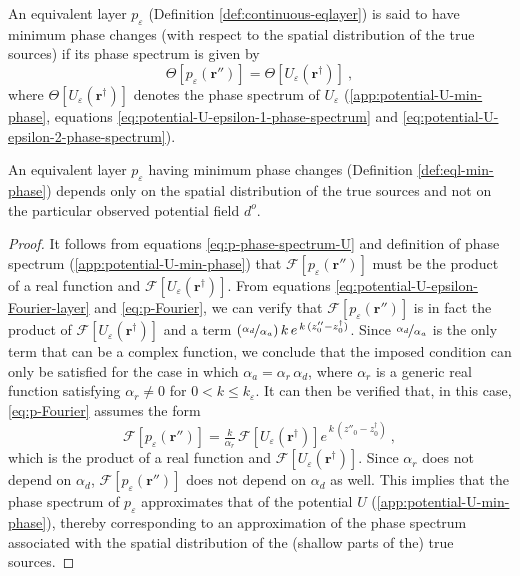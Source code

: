 \begin{definition}
	An equivalent layer $p_{\varepsilon}$ (Definition \ref{def:continuous-eqlayer}) is said to have minimum 
	phase changes (with respect to the spatial distribution of the true sources) if its phase spectrum is given by
	\begin{equation}
		\Theta [ p_{\varepsilon}(\mathbf{r}'') ] = \Theta [ U_{\varepsilon}(\mathbf{r}^{\dagger}) ] \: ,
		\label{eq:p-phase-spectrum-U}
	\end{equation}
	where $\Theta [ U_{\varepsilon}(\mathbf{r}^{\dagger}) ]$ denotes the phase spectrum of $U_{\varepsilon}$ 
	(\ref{app:potential-U-min-phase}, equations \ref{eq:potential-U-epsilon-1-phase-spectrum} and \ref{eq:potential-U-epsilon-2-phase-spectrum}).
	\label{def:eql-min-phase}
\end{definition}
\begin{proposition}
	\label{prop:minimum-phase-change-layers}
	An equivalent layer $p_{\varepsilon}$ having minimum phase changes (Definition \ref{def:eql-min-phase})
	depends only on the spatial distribution of the true sources and not on the particular observed 
	potential field $d^{o}$.
\end{proposition}
\begin{proof}
	It follows from equations \ref{eq:p-phase-spectrum-U} and definition of phase spectrum (\ref{app:potential-U-min-phase}) that 
	$\mathcal{F} [ p_{\varepsilon}(\mathbf{r}'') ]$ must be the product of a real function and
	$\mathcal{F} [ U_{\varepsilon}(\mathbf{r}^{\dagger}) ]$.
	From equations \ref{eq:potential-U-epsilon-Fourier-layer} and \ref{eq:p-Fourier}, we can verify that 
	$\mathcal{F} [ p_{\varepsilon}(\mathbf{r}'') ]$ is in fact the product of 
	$\mathcal{F} [ U_{\varepsilon}(\mathbf{r}^{\dagger}) ]$ 
	and a term $\left( \nicefrac{\alpha_{d}}{\alpha_{a}} \right) k \, e^{\, k \, (z''_{0} - z^{\dagger}_{0})}$. 
	Since $\nicefrac{\alpha_{d}}{\alpha_{a}}$ is the only term that can be a complex function, we conclude that 
	the imposed condition can only be satisfied for the case in which $\alpha_{a} = \alpha_{r} \, \alpha_{d}$, 
	where $\alpha_{r}$ is a generic real function satisfying $\alpha_{r} \ne 0$ for $0 < k \le k_{\varepsilon}$.
	It can then be verified that, in this case, \ref{eq:p-Fourier} assumes the form
	\begin{equation}
		\mathcal{F} [ p_{\varepsilon}(\mathbf{r}'') ] =
		\tfrac{k}{\alpha_{r}} \, \mathcal{F} [ U_{\varepsilon}(\mathbf{r}^{\dagger}) ] 
		e^{\, k \, (z''_{0} - z^{\dagger}_{0})} \: ,
		\label{eq:p-Fourier-min-phase}
	\end{equation}
	which is the product of a real function and $\mathcal{F} [ U_{\varepsilon}(\mathbf{r}^{\dagger}) ]$.
	Since $\alpha_{r}$ does not depend on $\alpha_{d}$, $\mathcal{F} [ p_{\varepsilon}(\mathbf{r}'') ]$ does not 
	depend on $\alpha_{d}$ as well. This implies that the phase spectrum of $p_{\varepsilon}$ approximates that 
	of the potential $U$ (\ref{app:potential-U-min-phase}), thereby corresponding to an approximation 
	of the phase spectrum associated with the spatial distribution of the (shallow parts of the) true sources.
\end{proof}

